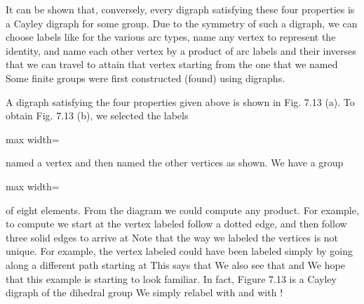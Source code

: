 \documentclass[11pt,oneside]{article}
\begin{document}
\begin{BookBody}

\noindent It can be shown that, conversely, every digraph satisfying these four properties is a Cayley digraph for some group. Due to the symmetry of such a digraph, we can choose labels like  for the various arc types, name any vertex  to represent the identity, and name each other vertex by a product of arc labels and their inverses that we can travel to attain that vertex starting from the one that we named  Some finite groups were first constructed (found) using digraphs.

 A digraph satisfying the four properties given above is shown in Fig. 7.13 (a). To obtain Fig. 7.13 (b), we selected the labels

\begin{center}\begin{adjustbox}{max width=\linewidth}\end{adjustbox}\end{center}

\noindent named a vertex  and then named the other vertices as shown. We have a group

\begin{center}\begin{adjustbox}{max width=\linewidth}\end{adjustbox}\end{center}

\noindent of eight elements. From the diagram we could compute any product. For example, to compute  we start at the vertex labeled  follow a dotted edge, and then follow three solid edges to arrive at  Note that the way we labeled the vertices is not unique. For example, the vertex labeled  could have been labeled  simply by going along a different path starting at  This says that  We also see that  and  We hope that this example is starting to look familiar. In fact, Figure 7.13 is a Cayley digraph of the dihedral group  We simply relabel  with \BookInline{\rho } and  with \BookInline{\mu }! \BookEnd{\blacktriangle}

\end{BookBody}
\end{document}

